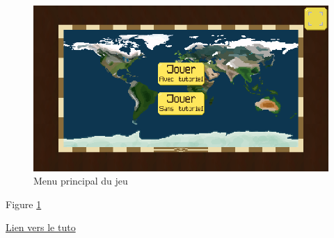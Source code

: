 \documentclass{article}
\begin{document}
        \begin{figure}[h]
                \includegraphics[width=\linewidth]{../images/mainMenu}
                \caption{Menu principal du jeu}
                \label{fig:mainMenu}
        \end{figure}

        Figure \ref{fig:mainMenu}

        \href{https://www.latex-tutorial.com/tutorials/pgfplots/}{Lien vers le tuto}
\end{document}
